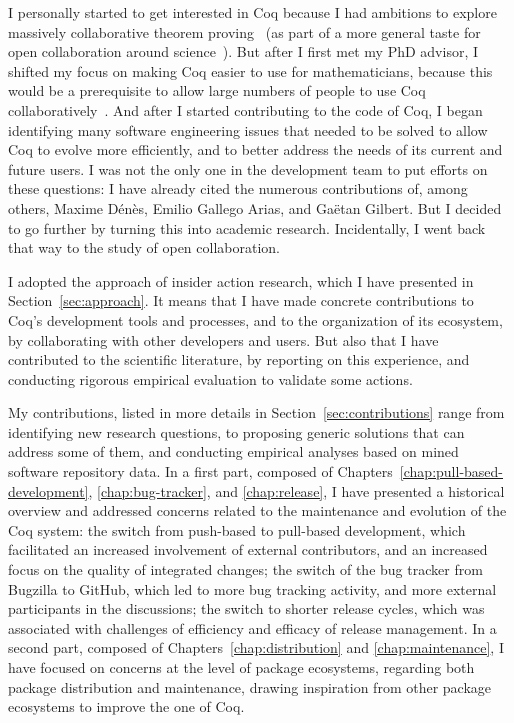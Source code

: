I personally started to get interested in Coq because I had ambitions to explore massively collaborative theorem proving~\cite{zimmermann2014proof} (as part of a more general taste for open collaboration around science~\cite{zimmermann2014science}).
But after I first met my PhD advisor, I shifted my focus on making Coq easier to use for mathematicians, because this would be a prerequisite to allow large numbers of people to use Coq collaboratively~\cite{zimmermann2014interface}.
And after I started contributing to the code of Coq, I began identifying many software engineering issues that needed to be solved to allow Coq to evolve more efficiently, and to better address the needs of its current and future users.
I was not the only one in the development team to put efforts on these questions: I have already cited the numerous contributions of, among others, Maxime D\'en\`es, Emilio Gallego Arias, and Ga\"etan Gilbert.
But I decided to go further by turning this into academic research.
Incidentally, I went back that way to the study of open collaboration.

I adopted the approach of insider action research, which I have presented in Section~\ref{sec:approach}.
It means that I have made concrete contributions to Coq's development tools and processes, and to the organization of its ecosystem, by collaborating with other developers and users.
But also that I have contributed to the scientific literature, by reporting on this experience, and conducting rigorous empirical evaluation to validate some actions.

My contributions, listed in more details in Section~\ref{sec:contributions} range from identifying new research questions, to proposing generic solutions that can address some of them, and conducting empirical analyses based on mined software repository data.
In a first part, composed of Chapters~\ref{chap:pull-based-development}, \ref{chap:bug-tracker}, and \ref{chap:release}, I have presented a historical overview and addressed concerns related to the maintenance and evolution of the Coq system: the switch from push-based to pull-based development, which facilitated an increased involvement of external contributors, and an increased focus on the quality of integrated changes; the switch of the bug tracker from Bugzilla to GitHub, which led to more bug tracking activity, and more external participants in the discussions; the switch to shorter release cycles, which was associated with challenges of efficiency and efficacy of release management.
In a second part, composed of Chapters~\ref{chap:distribution} and \ref{chap:maintenance}, I have focused on concerns at the level of package ecosystems, regarding both package distribution and maintenance, drawing inspiration from other package ecosystems to improve the one of Coq.

